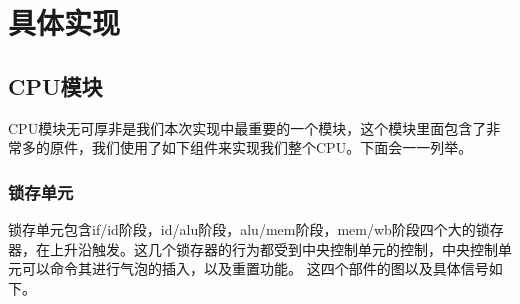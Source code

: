 \section{具体实现}
\subsection{CPU模块}
    CPU模块无可厚非是我们本次实现中最重要的一个模块，这个模块里面包含了非常多的原件，我们使用了如下组件来实现我们整个CPU。下面会一一列举。
\subsubsection{锁存单元}
    锁存单元包含if/id阶段，id/alu阶段，alu/mem阶段，mem/wb阶段四个大的锁存器，在上升沿触发。这几个锁存器的行为都受到中央控制单元的控制，中央控制单元可以命令其进行气泡的插入，以及重置功能。
    这四个部件的图以及具体信号如下。



